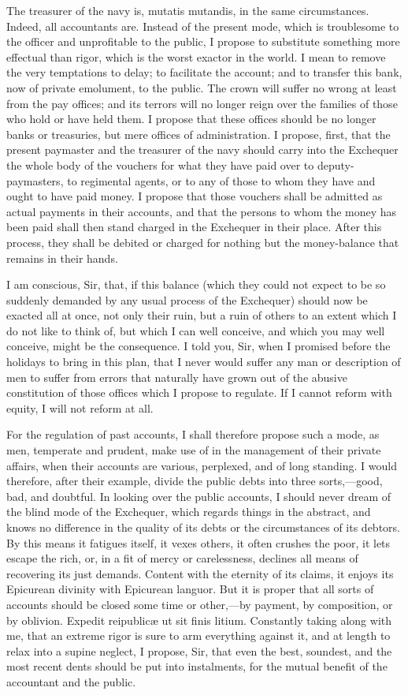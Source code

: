 The treasurer of the navy is, mutatis mutandis, in the same circumstances. Indeed, all accountants are. Instead of the present mode, which is troublesome to the officer and unprofitable to the public, I propose to substitute something more effectual than rigor, which is the worst exactor in the world. I mean to remove the very temptations to delay; to facilitate the account; and to transfer this bank, now of private emolument, to the public. The crown will suffer no wrong at least from the pay offices; and its terrors will no longer reign over the families of those who hold or have held them. I propose that these offices should be no longer banks or treasuries, but mere offices of administration. I propose, first, that the present paymaster and the treasurer of the navy should carry into the Exchequer the whole body of the vouchers for what they have paid over to deputy-paymasters, to regimental agents, or to any of those to whom they have and ought to have paid money. I propose that those vouchers shall be admitted as actual payments in their accounts, and that the persons to whom the money has been paid shall then stand charged in the Exchequer in their place. After this process, they shall be debited or charged for nothing but the money-balance that remains in their hands.

I am conscious, Sir, that, if this balance (which they could not expect to be so suddenly demanded by any usual process of the Exchequer) should now be exacted all at once, not only their ruin, but a ruin of others to an extent which I do not like to think of, but which I can well conceive, and which you may well conceive, might be the consequence. I told you, Sir, when I promised before the holidays to bring in this plan, that I never would suffer any man or description of men to suffer from errors that naturally have grown out of the abusive constitution of those offices which I propose to regulate. If I cannot reform with equity, I will not reform at all.

For the regulation of past accounts, I shall therefore propose such a mode, as men, temperate and prudent, make use of in the management of their private affairs, when their accounts are various, perplexed, and of long standing. I would therefore, after their example, divide the public debts into three sorts,—good, bad, and doubtful. In looking over the public accounts, I should never dream of the blind mode of the Exchequer, which regards things in the abstract, and knows no difference in the quality of its debts or the circumstances of its debtors. By this means it fatigues itself, it vexes others, it often crushes the poor, it lets escape the rich, or, in a fit of mercy or carelessness, declines all means of recovering its just demands. Content with the eternity of its claims, it enjoys its Epicurean divinity with Epicurean languor. But it is proper that all sorts of accounts should be closed some time or other,—by payment, by composition, or by oblivion. Expedit reipublicæ ut sit finis litium. Constantly taking along with me, that an extreme rigor is sure to arm everything against it, and at length to relax into a supine neglect, I propose, Sir, that even the best, soundest, and the most recent dents should be put into instalments, for the mutual benefit of the accountant and the public.


